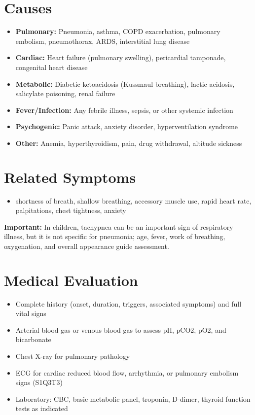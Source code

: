\section*{Causes}
\begin{itemize}
  \item \textbf{Pulmonary:} Pneumonia, asthma, COPD exacerbation, pulmonary embolism, pneumothorax, ARDS, interstitial lung disease
  \item \textbf{Cardiac:} Heart failure (pulmonary swelling), pericardial tamponade, congenital heart disease
  \item \textbf{Metabolic:} Diabetic ketoacidosis (Kussmaul breathing), lactic acidosis, salicylate poisoning, renal failure
  \item \textbf{Fever/Infection:} Any febrile illness, sepsis, or other systemic infection
  \item \textbf{Psychogenic:} Panic attack, anxiety disorder, hyperventilation syndrome
  \item \textbf{Other:} Anemia, hyperthyroidism, pain, drug withdrawal, altitude sickness
\end{itemize}

\section*{Related Symptoms}
\begin{itemize}
  \item shortness of breath, shallow breathing, accessory muscle use, rapid heart rate, palpitations, chest tightness, anxiety
\end{itemize}
\textbf{Important:} In children, tachypnea can be an important sign of respiratory illness, but it is not specific for pneumonia; age, fever, work of breathing, oxygenation, and overall appearance guide assessment.

\section*{Medical Evaluation}
\begin{itemize}
  \item Complete history (onset, duration, triggers, associated symptoms) and full vital signs
  \item Arterial blood gas or venous blood gas to assess pH, pCO2, pO2, and bicarbonate
  \item Chest X-ray for pulmonary pathology
  \item ECG for cardiac reduced blood flow, arrhythmia, or pulmonary embolism signs (S1Q3T3)
  \item Laboratory: CBC, basic metabolic panel, troponin, D-dimer, thyroid function tests as indicated
\end{itemize}

